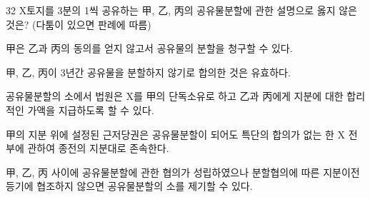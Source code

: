 \begin{question}{32}
X토지를 3분의 1씩 공유하는 甲, 乙, 丙의 공유물분할에 관한 설명으로 옳지 않은 것은? (다툼이 있으면 판례에 따름)
\begin{choices}
  \item 甲은 乙과 丙의 동의를 얻지 않고서 공유물의 분할을 청구할 수 있다.
  \item 甲, 乙, 丙이 3년간 공유물을 분할하지 않기로 합의한 것은 유효하다.
  \item 공유물분할의 소에서 법원은 X를 甲의 단독소유로 하고 乙과 丙에게 지분에 대한 합리적인 가액을 지급하도록 할 수 있다.
  \item 甲의 지분 위에 설정된 근저당권은 공유물분할이 되어도 특단의 합의가 없는 한 X 전부에 관하여 종전의 지분대로 존속한다.
  \item 甲, 乙, 丙 사이에 공유물분할에 관한 협의가 성립하였으나 분할협의에 따른 지분이전등기에 협조하지 않으면 공유물분할의 소를 제기할 수 있다.
\end{choices}
\end{question}
